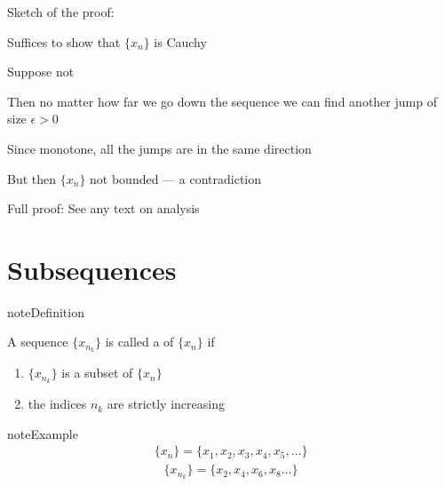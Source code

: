 \documentclass[letterpaper,10pt,english]{jupyterBook}
\begin{document}
\sphinxAtStartPar
Sketch of the proof:

\sphinxAtStartPar
Suffices to show that \(\{x_n\}\) is Cauchy

\sphinxAtStartPar
Suppose not

\sphinxAtStartPar
Then no matter how far we go down the sequence we can find another jump
of size \(\epsilon > 0\)

\sphinxAtStartPar
Since monotone, all the jumps are in the same direction

\sphinxAtStartPar
But then \(\{x_n\}\) not bounded — a contradiction

\sphinxAtStartPar
Full proof: See any text on analysis


\section{Subsequences}
\label{\detokenize{04.basic_analysis:subsequences}}
\begin{sphinxadmonition}{note}{Definition}

\sphinxAtStartPar
A sequence \(\{x_{n_k} \}\) is called a  of \(\{x_n\}\) if
\begin{enumerate}
%
\item {} 
\sphinxAtStartPar
\(\{x_{n_k} \}\) is a subset of \(\{x_n\}\)

\item {} 
\sphinxAtStartPar
the indices \(n_k\) are strictly increasing

\end{enumerate}
\end{sphinxadmonition}

\begin{sphinxadmonition}{note}{Example}
\begin{equation*}
\begin{split}
\{x_n\} = \{x_1, x_2, x_3, x_4, x_5, \ldots\} 
\end{split}
\end{equation*}\begin{equation*}
\begin{split}
\{x_{n_k}\} = \{x_2, x_4, x_6, x_8 \ldots\} 
\end{split}
\end{equation*}\end{sphinxadmonition}
\end{document}
